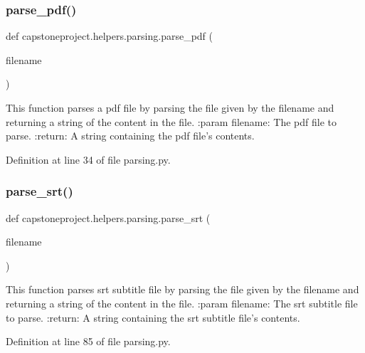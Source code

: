 \subsubsection{\texorpdfstring{parse\+\_\+pdf()}{parse\_pdf()}}
{\footnotesize\ttfamily def capstoneproject.\+helpers.\+parsing.\+parse\+\_\+pdf (\begin{DoxyParamCaption}\item[{}]{filename }\end{DoxyParamCaption})}

\begin{DoxyVerb}This function parses a pdf file by parsing the file given by the filename and returning a string of the content in
the file.
:param filename: The pdf file to parse.
:return: A string containing the pdf file's contents.
\end{DoxyVerb}
 

Definition at line 34 of file parsing.\+py.

\mbox{\label{namespacecapstoneproject_1_1helpers_1_1parsing_affb8b513c7f687e47ca2c068cfa28d2d}} 
\subsubsection{\texorpdfstring{parse\+\_\+srt()}{parse\_srt()}}
{\footnotesize\ttfamily def capstoneproject.\+helpers.\+parsing.\+parse\+\_\+srt (\begin{DoxyParamCaption}\item[{}]{filename }\end{DoxyParamCaption})}

\begin{DoxyVerb}This function parses srt subtitle file by parsing the file given by the filename and returning a string of the
content in the file.
:param filename: The srt subtitle file to parse.
:return: A string containing the srt subtitle file's contents.
\end{DoxyVerb}
 

Definition at line 85 of file parsing.\+py.

\mbox{\label{namespacecapstoneproject_1_1helpers_1_1parsing_aeb58d9fbf20a62927e3f22490f1dc760}} 

